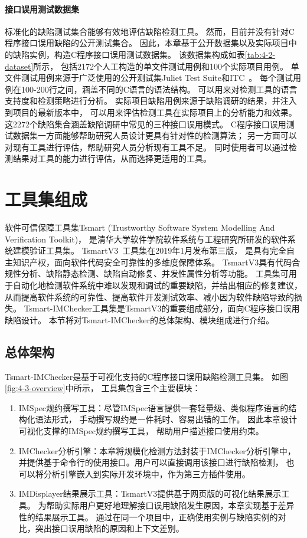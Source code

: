\paragraph{接口误用测试数据集}
标准化的缺陷测试集合能够有效地评估缺陷检测工具。
然而，目前并没有针对C程序接口误用缺陷的公开测试集合。
因此，本章基于公开数据集以及实际项目中的缺陷实例，构造C程序接口误用测试数据集。
该数据集构成如表\ref{tab:4-2-dataset}所示，
包括2172个人工构造的单文件测试用例和100个实际项目用例。
单文件测试用例来源于广泛使用的公开测试集Juliet Test Suite和ITC~\cite{itc}。
每个测试用例在100-200行之间，涵盖不同的C语言的语法结构。
可以用来对检测工具的语言支持度和检测策略进行分析。
实际项目缺陷用例来源于缺陷调研的结果，并注入到项目的最新版本中，
可以用来评估检测工具在实际项目上的分析能力和效果。
这2272个缺陷集合涵盖缺陷调研中常见的三种接口误用模式。
C程序接口误用测试数据集一方面能够帮助研究人员设计更具有针对性的检测算法；
另一方面可以对现有工具进行评估，帮助研究人员分析现有工具不足。
同时使用者可以通过检测结果对工具的能力进行评估，从而选择更适用的工具。


\section{工具集组成}
\label{sec:4.3}
软件可信保障工具集Tsmart (Trustworthy Software System Modelling And Verification Toolkit)，
是清华大学软件学院软件系统与工程研究所研发的软件系统建模验证工具集。
TsmartV3~\cite{tsmart}工具集在2019年1月发布第三版，
是具有完全自主知识产权，面向软件代码安全可靠性的多维度保障体系。
TsmartV3具有代码合规性分析、缺陷静态检测、缺陷自动修复、并发性属性分析等功能。
工具集可用于自动化地检测软件系统中难以发现和调试的重要缺陷，并给出相应的修复建议，
从而提高软件系统的可靠性、提高软件开发测试效率、减小因为软件缺陷导致的损失。
Tsmart-IMChecker工具集是TsmartV3的重要组成部分，面向C程序接口误用缺陷设计。
本节将对Tsmart-IMChecker的总体架构、模块组成进行介绍。

\subsection{总体架构}
Tsmart-IMChecker是基于可视化支持的C程序接口误用缺陷检测工具集。
如图\ref{fig:4-3-overview}中所示，
工具集包含三个主要模块：
\begin{enumerate}
	\item IMSpec规约撰写工具：尽管IMSpec语言提供一套轻量级、类似程序语言的结构化语法形式，
	手动撰写规约是一件耗时、容易出错的工作。
	因此本章设计可视化支撑的IMSpec规约撰写工具，
	帮助用户描述接口使用约束。
	\item IMChecker分析引擎：本章将规模化检测方法封装于IMChecker分析引擎中，
	并提供基于命令行的使用接口。用户可以直接调用该接口进行缺陷检测，
	也可以将分析引擎嵌入到实际开发环境中，作为第三方插件使用。
	\item IMDisplayer结果展示工具：TsmartV3提供基于网页版的可视化结果展示工具。
	为帮助实际用户更好地理解接口误用缺陷发生原因，本章实现基于差异性的结果展示工具。
	通过在同一个项目中，正确使用实例与缺陷实例的对比，突出接口误用缺陷的原因和上下文差别。
\end{enumerate}

